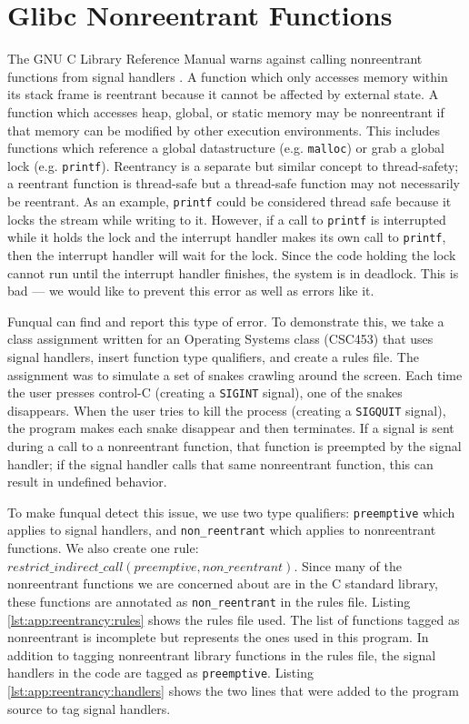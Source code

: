 \section{Glibc Nonreentrant Functions}\label{sec:app:reentrancy}


The GNU C Library Reference Manual warns against calling nonreentrant functions from signal handlers \cite{gnu-manual}.  A function which only accesses memory within its stack frame is reentrant because it cannot be affected by external state.  A function which accesses heap, global, or static memory may be nonreentrant if that memory can be modified by other execution environments.  This includes functions which reference a global datastructure (e.g. \lstinline{malloc}) or grab a global lock (e.g. \lstinline{printf}).  Reentrancy is a separate but similar concept to thread-safety; a reentrant function is thread-safe but a thread-safe function may not necessarily be reentrant.  As an example, \lstinline{printf} could be considered thread safe because it locks the stream while writing to it.  However, if a call to \lstinline{printf} is interrupted while it holds the lock and the interrupt handler makes its own call to \lstinline{printf}, then the interrupt handler will wait for the lock.  Since the code holding the lock cannot run until the interrupt handler finishes, the system is in deadlock.  This is bad --- we would like to prevent this error as well as errors like it.  

Funqual can find and report this type of error.  To demonstrate this, we take a class assignment written for an Operating Systems class (CSC453) that uses signal handlers, insert function type qualifiers, and create a rules file.  The assignment was to simulate a set of snakes crawling around the screen.  Each time the user presses control-C (creating a \lstinline{SIGINT} signal), one of the snakes disappears.  When the user tries to kill the process (creating a \lstinline{SIGQUIT} signal), the program makes each snake disappear and then terminates.  If a signal is sent during a call to a nonreentrant function, that function is preempted by the signal handler; if the signal handler calls that same nonreentrant function, this can result in undefined behavior.  

To make funqual detect this issue, we use two type qualifiers: \lstinline{preemptive} which applies to signal handlers, and \lstinline{non_reentrant} which applies to nonreentrant functions.  We also create one rule: $restrict\_indirect\_call(preemptive, non\_reentrant)$.  Since many of the nonreentrant functions we are concerned about are in the C standard library, these functions are annotated as \lstinline{non_reentrant} in the rules file.  Listing \ref{lst:app:reentrancy:rules} shows the rules file used.  The list of functions tagged as nonreentrant is incomplete but represents the ones used in this program.  In addition to tagging nonreentrant library functions in the rules file, the signal handlers in the code are tagged as \lstinline{preemptive}.  Listing \ref{lst:app:reentrancy:handlers} shows the two lines that were added to the program source to tag signal handlers.  

